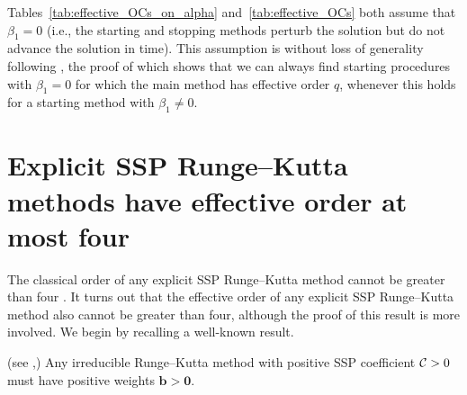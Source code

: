 \documentclass[final]{siamltex}  %
\begin{document}
Tables~\ref{tab:effective_OCs_on_alpha} and~\ref{tab:effective_OCs}
both assume that $\beta_1=0$ (i.e., the starting and stopping methods
perturb the solution but do not advance the solution in time).  This
assumption is without loss of generality following \cite[Lemma
389A]{Butcher2008_book}, the proof of which shows that we can always find 
starting procedures with $\beta_1 = 0$ for which the main method has 
effective order $q$, whenever this holds for a starting method with 
$\beta_1 \neq 0$.


\section{Explicit SSP Runge--Kutta methods have effective order at most four}\label{sec:ExRK_barrier}
The classical order of any explicit SSP Runge--Kutta method cannot be greater
than four \cite{Ruuth2002}.
It turns out that the effective order of any explicit SSP Runge--Kutta method 
also cannot be greater than four, although the proof of this result is more
involved.
We begin by recalling a well-known result.
\begin{lemma}\label{lem:positive_b}(see \cite[Theorem~4.2]{Kraaijevanger1991},\cite[Lemma 4.2]{Ruuth2002})
	Any irreducible Runge--Kutta method with positive SSP coefficient $\mathcal{C}>0$
	must have positive weights $\bm{b} > \bm{0}$.
\end{lemma}
\end{document}
